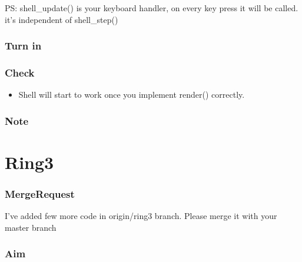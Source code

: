 \documentclass[]{book}
\newenvironment{Shaded}{}{}
\newcommand{\KeywordTok}[1]{\textbf{{#1}}}
\newcommand{\NormalTok}[1]{{#1}}
\begin{document}
PS: shell\_update() is your keyboard handler, on every key press it will
be called. it's independent of shell\_step()

\subsubsection*{Turn in}\label{turn-in-8}

\subsubsection*{Check}\label{check-8}

\begin{itemize}
\itemsep1pt\parskip0pt
\item
  Shell will start to work once you implement render() correctly.
\end{itemize}

\subsubsection*{Note}\label{note-10}

\section{Ring3}\label{ring3}

\subsubsection*{MergeRequest}\label{mergerequest-9}

I've added few more code in origin/ring3 branch. Please merge it with
your master branch

\begin{Shaded}
\end{Shaded}

\subsubsection*{Aim}\label{aim-9}
\end{document}
